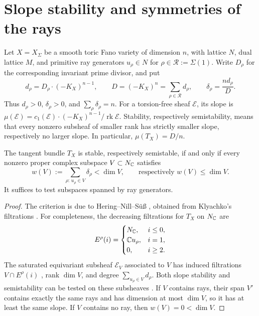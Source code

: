 \section{Slope stability and symmetries of the rays}\label{sec:stability}

Let $X=X_\Sigma$ be a smooth toric Fano variety of dimension $n$, with
lattice $N$, dual lattice $M$, and primitive ray generators
$u_\rho\in N$ for $\rho\in\mathcal R:=\Sigma(1)$. Write $D_\rho$ for the
corresponding invariant prime divisor, and put
\[
 d_\rho=D_\rho\cdot(-K_X)^{n-1},\qquad
 D=(-K_X)^n=\sum_{\rho\in\mathcal R}d_\rho,\qquad
 \delta_\rho=\frac{n d_\rho}{D}.
\]
Thus $d_\rho>0$, $\delta_\rho>0$, and $\sum_\rho\delta_\rho=n$.
For a torsion-free sheaf $\mathcal E$, its slope is
$\mu(\mathcal E)=c_1(\mathcal E)\cdot(-K_X)^{n-1}/\operatorname{rk}\mathcal E$.
Stability, respectively semistability, means that every nonzero subsheaf
of smaller rank has strictly smaller slope, respectively no larger
slope. In particular, $\mu(T_X)=D/n$.

\begin{lemma}\label{lem:klyachko}
The tangent bundle $T_X$ is stable, respectively semistable, if and only
if every nonzero proper complex subspace $V\subset N_{\mathbb{C}}$ satisfies
\begin{equation}\label{eq:klyachko}
 w(V):=\sum_{\rho:\,u_\rho\in V}\delta_\rho
 <\dim V,\qquad\text{respectively }w(V)\le\dim V.
\end{equation}
It suffices to test subspaces spanned by ray generators.
\end{lemma}

\begin{proof}
The criterion is due to Hering--Nill--S\"u\ss{}
\cite[Proposition 1.2 and Remark 2.6]{HeringNillSuess2022}, obtained from
Klyachko's filtrations \cite{Klyachko1990}. For completeness, the
decreasing filtrations for $T_X$ on $N_{\mathbb{C}}$ are
\[
 E^\rho(i)=
 \begin{cases}
 N_{\mathbb{C}},&i\le0,\\
 \mathbb{C} u_\rho,&i=1,\\
 0,&i\ge2.
 \end{cases}
\]
The saturated equivariant subsheaf $\mathcal E_V$ associated to $V$ has
induced filtrations $V\cap E^\rho(i)$
\cite[Corollary 0.0.2]{DasguptaDeyKhan2021}, rank $\dim V$, and degree
$\sum_{u_\rho\in V}d_\rho$. Both slope stability and semistability can be
tested on these subsheaves
\cite[Proposition 2.3 and Remark 2.4]{HeringNillSuess2022}.
If $V$ contains rays, their span $V'$ contains exactly the same rays and
has dimension at most $\dim V$, so it has at least the same slope.
If $V$ contains no ray, then $w(V)=0<\dim V$.
\end{proof}

